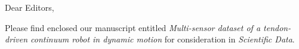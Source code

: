\documentclass{letter}
\begin{document}
\begin{letter}{}
\opening{Dear Editors,}

Please find enclosed our manuscript entitled \textit{Multi-sensor dataset
of a tendon-driven continuum robot in dynamic motion} for consideration
in \textit{Scientific Data}.
\end{letter}
\end{document}
